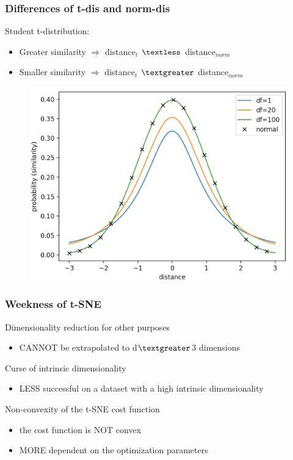 \documentclass{beamer}
\begin{document}
\begin{frame}
  \frametitle{Differences of t-dis and norm-dis}
      Student t-distribution: 
      \begin{itemize}
        \item Greater similarity $\Longrightarrow$ distance$_t$ $\textless$ distance$_{norm}$
        \item Smaller similarity $\Longrightarrow$ distance$_t$ $\textgreater$ distance$_{norm}$
      \end{itemize}
    \begin{figure}
        \centering
        \includegraphics[height=0.6\textheight]{images/figure4.png}
    \end{figure}

\end{frame}
%
%
%
%
%
%
\begin{frame}
  \frametitle{Weekness of t-SNE}
    Dimensionality reduction for other purposes
    \begin{itemize}
    \item CANNOT be extrapolated to d$\textgreater$3 dimensions
    \end{itemize}
    Curse of intrinsic dimensionality
    \begin{itemize}
    \item LESS successful on a dataset with a high intrinsic dimensionality
    \end{itemize}
    Non-convexity of the t-SNE cost function
    \begin{itemize}
    \item the cost function is NOT convex
    \item MORE dependent on the optimization parameters
    \end{itemize}
\end{frame}
\end{document}
